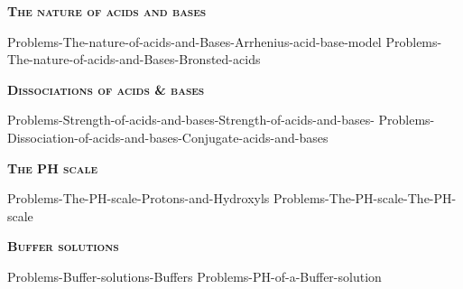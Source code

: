 \documentclass[main.tex]{subfiles}
\newcommand\chapterlabel{Ch-acidbase}
\begin{document}
\newpage
 
\fancyhfoffset[E,O]{0pt}
\setlength{\columnsep}{30pt}
\begin{conclusion}
\end{conclusion}
\begin{multicols*}{2}\setcounter{numA}{1}
{\raggedright\textsc{\textbf{The nature of acids and bases}}\par}
 {Problems-The-nature-of-acids-and-Bases-Arrhenius-acid-base-model}
 {Problems-The-nature-of-acids-and-Bases-Bronsted-acids}
 
 \iftoggle{chem121}{}{
 {Problems-The-nature-of-acids-and-Bases-Lewis-acid-base-model}
}
{\raggedright\textsc{\textbf{Dissociations of acids \& bases}}\par}
 {Problems-Strength-of-acids-and-bases-Strength-of-acids-and-bases-}
 {Problems-Dissociation-of-acids-and-bases-Conjugate-acids-and-bases}
 
{\raggedright\textsc{\textbf{The PH scale}}\par}
 {Problems-The-PH-scale-Protons-and-Hydroxyls}
 {Problems-The-PH-scale-The-PH-scale}
 
 \iftoggle{chem121}{}{
  {\raggedright\textsc{\textbf{PH of strong acid-base solutions}}\par}
 {Problems-The-PH-scale-PH-of-strong-electrolyte-solutions} 

 
 {\raggedright\textsc{\textbf{PH of weak acid-base solutions}}\par}
 {Problems-The-PH-scale-PH-of-solutions-of-weak-acids-and-bases} 
 {Problems-The-PH-scale-PH-of-solutions-of-weak-acids-and-bases-Solutions-of-acids-and-bases} 
}	


{\raggedright\textsc{\textbf{Buffer solutions}}\par}
 {Problems-Buffer-solutions-Buffers}
  {Problems-PH-of-a-Buffer-solution}
  

\end{multicols*}
\end{document}
